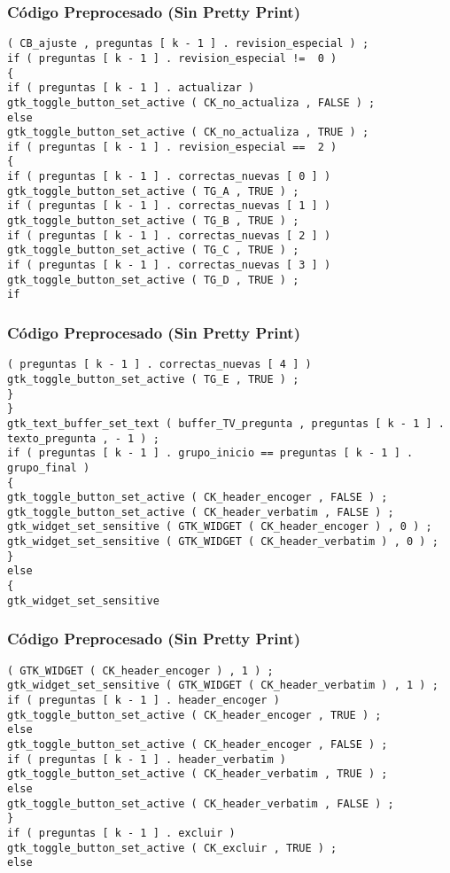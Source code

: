 \documentclass{beamer}
\begin{document}
\begin{frame}[fragile]
\frametitle{C\'odigo Preprocesado (Sin Pretty Print)}
\begin{lstlisting}[style=CStyle]
( CB_ajuste , preguntas [ k - 1 ] . revision_especial ) ; 
if ( preguntas [ k - 1 ] . revision_especial !=  0 ) 
{ 
if ( preguntas [ k - 1 ] . actualizar ) 
gtk_toggle_button_set_active ( CK_no_actualiza , FALSE ) ; 
else 
gtk_toggle_button_set_active ( CK_no_actualiza , TRUE ) ; 
if ( preguntas [ k - 1 ] . revision_especial ==  2 ) 
{ 
if ( preguntas [ k - 1 ] . correctas_nuevas [ 0 ] ) gtk_toggle_button_set_active ( TG_A , TRUE ) ; 
if ( preguntas [ k - 1 ] . correctas_nuevas [ 1 ] ) gtk_toggle_button_set_active ( TG_B , TRUE ) ; 
if ( preguntas [ k - 1 ] . correctas_nuevas [ 2 ] ) gtk_toggle_button_set_active ( TG_C , TRUE ) ; 
if ( preguntas [ k - 1 ] . correctas_nuevas [ 3 ] ) gtk_toggle_button_set_active ( TG_D , TRUE ) ; 
if \end{lstlisting}
\end{frame}
\begin{frame}[fragile]
\frametitle{C\'odigo Preprocesado (Sin Pretty Print)}
\begin{lstlisting}[style=CStyle]
( preguntas [ k - 1 ] . correctas_nuevas [ 4 ] ) gtk_toggle_button_set_active ( TG_E , TRUE ) ; 
} 
} 
gtk_text_buffer_set_text ( buffer_TV_pregunta , preguntas [ k - 1 ] . texto_pregunta , - 1 ) ; 
if ( preguntas [ k - 1 ] . grupo_inicio == preguntas [ k - 1 ] . grupo_final ) 
{ 
gtk_toggle_button_set_active ( CK_header_encoger , FALSE ) ; 
gtk_toggle_button_set_active ( CK_header_verbatim , FALSE ) ; 
gtk_widget_set_sensitive ( GTK_WIDGET ( CK_header_encoger ) , 0 ) ; 
gtk_widget_set_sensitive ( GTK_WIDGET ( CK_header_verbatim ) , 0 ) ; 
} 
else 
{ 
gtk_widget_set_sensitive \end{lstlisting}
\end{frame}
\begin{frame}[fragile]
\frametitle{C\'odigo Preprocesado (Sin Pretty Print)}
\begin{lstlisting}[style=CStyle]
( GTK_WIDGET ( CK_header_encoger ) , 1 ) ; 
gtk_widget_set_sensitive ( GTK_WIDGET ( CK_header_verbatim ) , 1 ) ; 
if ( preguntas [ k - 1 ] . header_encoger ) 
gtk_toggle_button_set_active ( CK_header_encoger , TRUE ) ; 
else 
gtk_toggle_button_set_active ( CK_header_encoger , FALSE ) ; 
if ( preguntas [ k - 1 ] . header_verbatim ) 
gtk_toggle_button_set_active ( CK_header_verbatim , TRUE ) ; 
else 
gtk_toggle_button_set_active ( CK_header_verbatim , FALSE ) ; 
} 
if ( preguntas [ k - 1 ] . excluir ) 
gtk_toggle_button_set_active ( CK_excluir , TRUE ) ; 
else \end{lstlisting}
\end{frame}
\end{document}
